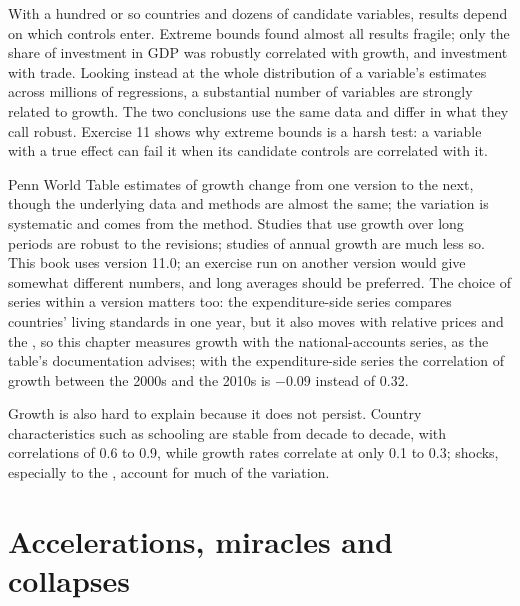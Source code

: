 \begin{record}
With a hundred or so countries and dozens of candidate variables, results depend on
which controls enter. Extreme bounds found almost all results fragile; only the
share of investment in GDP was robustly correlated with growth, and investment with
trade. %
Looking instead at the whole distribution of a variable's estimates across millions
of regressions, a substantial number of variables are strongly related to growth. %
The two conclusions use the same data and differ in what they call robust.
Exercise 11 shows why extreme bounds is a harsh test: a variable with a true effect can
fail it when its candidate controls are correlated with it.
\end{record}

\begin{measure}
Penn World Table estimates of growth change from one version to the next, though the
underlying data and methods are almost the same; the variation is systematic and comes
from the method. Studies that use growth over long periods are robust to the revisions;
studies of annual growth are much less so. %
This book uses version 11.0; an exercise run on another version would give somewhat
different numbers, and long averages should be preferred. The choice of series within
a version matters too: the expenditure-side series compares countries' living
standards in one year, but it also moves with relative prices and the ,
so this chapter measures growth with the national-accounts series, as the table's
documentation advises; with the expenditure-side series the correlation of growth
between the 2000s and the 2010s is $-0.09$ instead of 0.32.
\end{measure}

Growth is also hard to explain because it does not persist. Country characteristics
such as schooling are stable from decade to decade, with correlations of 0.6 to 0.9, while
growth rates correlate at only 0.1 to 0.3; shocks, especially to the , account for
much of the variation. %

\section{Accelerations, miracles and collapses}\label{sec:b3:growth-empirics:accelerations}

